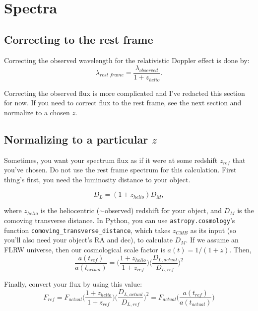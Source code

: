 \section{Spectra}
\subsection{Correcting to the rest frame}
\label{sec:spec_restframe}
Correcting the observed wavelength for the relativistic Doppler effect is done by: 
\begin{equation}
    \lambda_{rest \,\, frame} = \frac{\lambda_{observed}}{1+z_{helio}}.
\end{equation}

Correcting the observed flux is more complicated and I've redacted this section for now. If you need to correct flux to the rest frame, see the next section and normalize to a chosen $z$. 

\subsection{Normalizing to a particular $z$}
Sometimes, you want your spectrum flux as if it were at some redshift $z_{ref}$ that you've chosen. Do not use the rest frame spectrum for this calculation. First thing's first, you need the luminosity distance to your object.

\begin{equation}
    D_{L} = (1+z_{helio})D_{M},
\end{equation}

where $z_{helio}$ is the heliocentric ($\sim$observed) redshift for your object, and $D_{M}$ is the comoving transverse distance. In Python, you can use \texttt{astropy.cosmology}'s function \texttt{comoving\_transverse\_distance}, which takes $z_{CMB}$ as its input (so you'll also need your object's RA and dec), to calculate $D_{M}$. If we assume an FLRW universe, then our cosmological scale factor is $a(t) = 1/(1+z)$. Then,
\begin{equation}
    \frac{a(t_{ref})}{a(t_{actual})} = \Big( \frac{1 + z_{helio}}{1+z_{ref}} \Big) \Big( \frac{D_{L, actual}}{D_{L, ref}} \Big)^{2}
\end{equation}

Finally, convert your flux by using this value:
\begin{equation}
    F_{ref} = F_{actual}\Big( \frac{1 + z_{helio}}{1+z_{ref}} \Big) \Big( \frac{D_{L, actual}}{D_{L, ref}} \Big)^{2} = F_{actual} \Big(\frac{a(t_{ref})}{a(t_{actual})} \Big)
\end{equation}

